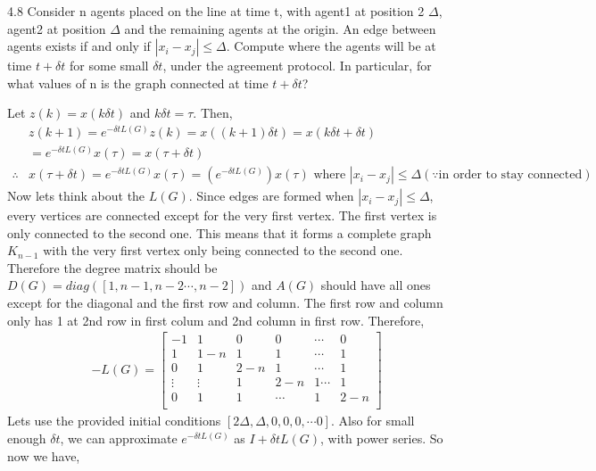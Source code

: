 \documentclass{article}
\begin{document}
\begin{problem} 4.8
    Consider n agents placed on the line at time t, with agent1 at position 2 $\Delta$, agent2 at position $\Delta$ and the remaining agents at the origin. An edge between agents exists if and only if $|x_i - x_j| \leq \Delta$. Compute where the agents will be at time $t + \delta t$ for some small $\delta t$, under the agreement protocol. In particular, for what values of n is the graph connected at time $t + \delta t$?

    Let $z(k) = x(k\delta t)$ and $k\delta t = \tau$. Then, 
    \begin{align*}
        &z(k + 1) = e^{-\delta t L(G)} z(k) = x((k+1)\delta t)=  x(k \delta t + \delta t)\\
        &=e^{-\delta t L(G)}  x(\tau) = x (\tau + \delta t)\\
        \therefore & x (\tau + \delta t) = e^{-\delta t L(G)}  x(\tau) = (e^{-\delta t L(G)} ) x(\tau) \text{ where } |x_i - x_j|\leq \Delta (\because \text{in order to stay connected})
    \end{align*}
    Now lets think about the $L(G)$. Since edges are formed when $|x_i - x_j| \leq \Delta$, every vertices are connected except for the very first vertex. The first vertex is only connected to the second one. This means that it forms a complete graph $K_{n-1}$ with the very first vertex only being connected to the second one. Therefore the degree matrix should be $D(G) = diag([1, n-1, n-2 \cdots , n-2])$ and $A(G)$ should have all ones except for the diagonal and the first row and column. The first row and column only has 1 at 2nd row in first colum and 2nd column in first row. Therefore, 
    \begin{align*}
        &-L(G) = \begin{bmatrix*}
            -1 & 1 & 0 & 0 & \cdots &0 \\
             1 & 1-n & 1 & 1 & \cdots & 1\\
             0 & 1 & 2-n & 1 & \cdots & 1 \\
             \vdots & \vdots & 1&2-n &1 \cdots &1\\
             0& 1&1&\cdots &1&2-n\\
        \end{bmatrix*}
    \end{align*}
    Lets use the provided initial conditions $[2\Delta, \Delta, 0, 0, 0, \cdots 0]$. Also for small enough $\delta t$, we can approximate $e^{-\delta t L(G)}$ as $I + \delta t L(G)$, with power series. So now we have, 

\end{problem}
\end{document}
